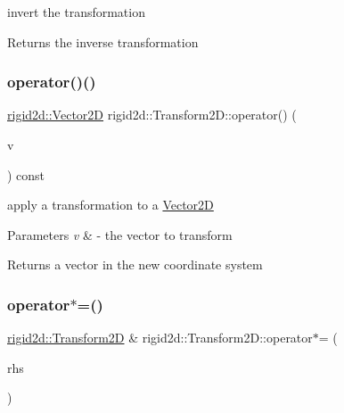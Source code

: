 invert the transformation 

\begin{DoxyReturn}{Returns}
the inverse transformation 
\end{DoxyReturn}
\mbox{\label{classrigid2d_1_1Transform2D_a80fbe5f0ea600b82812749d3c9e0f219}} 
\subsubsection{\texorpdfstring{operator()()}{operator()()}}
{\footnotesize\ttfamily \hyperlink{structrigid2d_1_1Vector2D}{rigid2d\+::\+Vector2D} rigid2d\+::\+Transform2\+D\+::operator() (\begin{DoxyParamCaption}\item[{\hyperlink{structrigid2d_1_1Vector2D}{rigid2d\+::\+Vector2D}}]{v }\end{DoxyParamCaption}) const}



apply a transformation to a \hyperlink{structrigid2d_1_1Vector2D}{Vector2D} 


\begin{DoxyParams}{Parameters}
{\em v} & -\/ the vector to transform \\
\hline
\end{DoxyParams}
\begin{DoxyReturn}{Returns}
a vector in the new coordinate system 
\end{DoxyReturn}
\mbox{\label{classrigid2d_1_1Transform2D_a39a7a37c3be80717b8d2fe6cf00c1fbf}} 
\subsubsection{\texorpdfstring{operator$\ast$=()}{operator*=()}}
{\footnotesize\ttfamily \hyperlink{classrigid2d_1_1Transform2D}{rigid2d\+::\+Transform2D} \& rigid2d\+::\+Transform2\+D\+::operator$\ast$= (\begin{DoxyParamCaption}\item[{const \hyperlink{classrigid2d_1_1Transform2D}{Transform2D} \&}]{rhs }\end{DoxyParamCaption})}



